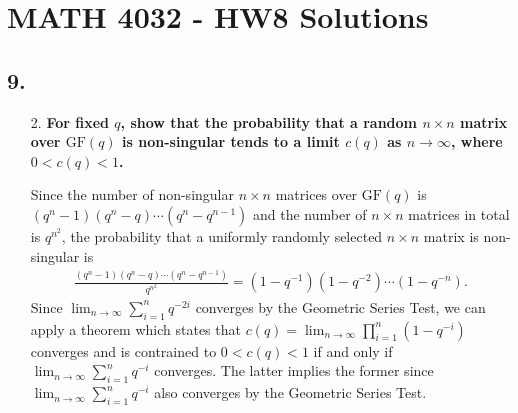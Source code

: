\documentclass[a4paper,12pt]{article}
\begin{document}
\section*{MATH 4032 - HW8 Solutions}
\subsection*{9.}
\begin{enumerate}
    \item[2.]
        \boldmath
        \textbf{For fixed $q$, show that the probability that a random $n \times n$ matrix over $\text{GF}(q)$ is non-singular tends to a limit $c(q)$ as $n \to \infty$, where $0 < c(q) < 1$.} \par
        \unboldmath
        Since the number of non-singular $n \times n$ matrices over $\text{GF}(q)$ is $(q^n - 1)(q^n - q) \cdots (q^n - q^{n - 1})$ and the number of $n \times n$ matrices in total is $q^{n^2}$, the probability that a uniformly randomly selected $n \times n$ matrix is non-singular is
        \begin{align*}
            \frac{(q^n - 1)(q^n - q) \cdots (q^n - q^{n - 1})}{q^{n^2}} = (1 - q^{-1})(1 - q^{-2}) \cdots (1 - q^{-n}).
        \end{align*}
        Since $\lim_{n \to \infty} \sum_{i = 1}^n q^{-2i}$ converges by the Geometric Series Test, we can apply a theorem which states that $c(q) = \lim_{n \to \infty} \prod_{i = 1}^n (1 - q^{-i})$ converges and is contrained to $0 < c(q) < 1$ if and only if $\lim_{n \to \infty} \sum_{i = 1}^n q^{-i}$ converges. The latter implies the former since $\lim_{n \to \infty} \sum_{i = 1}^n q^{-i}$ also converges by the Geometric Series Test.


\end{enumerate}
\end{document}
